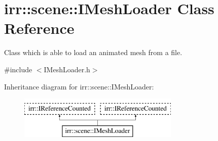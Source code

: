\hypertarget{classirr_1_1scene_1_1IMeshLoader}{}\section{irr\+:\+:scene\+:\+:I\+Mesh\+Loader Class Reference}
\label{classirr_1_1scene_1_1IMeshLoader}


Class which is able to load an animated mesh from a file.  




{\ttfamily \#include $<$I\+Mesh\+Loader.\+h$>$}

Inheritance diagram for irr\+:\+:scene\+:\+:I\+Mesh\+Loader\+:\begin{figure}[H]
\begin{center}
\leavevmode
\includegraphics[height=2.000000cm]{classirr_1_1scene_1_1IMeshLoader}
\end{center}
\end{figure}
